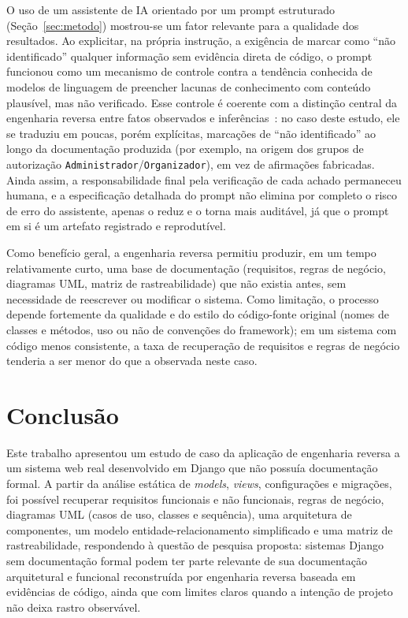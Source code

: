 \documentclass[12pt]{article}
\begin{document}
O uso de um assistente de IA orientado por um prompt estruturado
(Seção~\ref{sec:metodo}) mostrou-se um fator relevante para a qualidade dos
resultados. Ao explicitar, na própria instrução, a exigência de marcar como
``não identificado'' qualquer informação sem evidência direta de código, o
prompt funcionou como um mecanismo de controle contra a tendência conhecida
de modelos de linguagem de preencher lacunas de conhecimento com conteúdo
plausível, mas não verificado. Esse controle é coerente com a distinção
central da engenharia reversa entre fatos observados e
inferências~\cite{chikofsky1990}: no caso deste estudo, ele se traduziu em
poucas, porém explícitas, marcações de ``não identificado'' ao longo da
documentação produzida (por exemplo, na origem dos grupos de autorização
\texttt{Administrador}/\texttt{Organizador}), em vez de afirmações
fabricadas. Ainda assim, a responsabilidade final pela verificação de cada
achado permaneceu humana, e a especificação detalhada do prompt não elimina
por completo o risco de erro do assistente, apenas o reduz e o torna mais
auditável, já que o prompt em si é um artefato registrado e reprodutível.

Como benefício geral, a engenharia reversa permitiu produzir, em um tempo
relativamente curto, uma base de documentação (requisitos, regras de
negócio, diagramas UML, matriz de rastreabilidade) que não existia antes,
sem necessidade de reescrever ou modificar o sistema. Como limitação, o
processo depende fortemente da qualidade e do estilo do código-fonte
original (nomes de classes e métodos, uso ou não de convenções do
framework); em um sistema com código menos consistente, a taxa de
recuperação de requisitos e regras de negócio tenderia a ser menor do que a
observada neste caso.

\section{Conclusão}
\label{sec:conclusao}

Este trabalho apresentou um estudo de caso da aplicação de engenharia
reversa a um sistema web real desenvolvido em Django que não possuía
documentação formal. A partir da análise estática de \emph{models},
\emph{views}, configurações e migrações, foi possível recuperar requisitos
funcionais e não funcionais, regras de negócio, diagramas UML (casos de uso,
classes e sequência), uma arquitetura de componentes, um modelo
entidade-relacionamento simplificado e uma matriz de rastreabilidade,
respondendo à questão de pesquisa proposta: sistemas Django sem documentação
formal podem ter parte relevante de sua documentação arquitetural e
funcional reconstruída por engenharia reversa baseada em evidências de
código, ainda que com limites claros quando a intenção de projeto não deixa
rastro observável.
\end{document}
